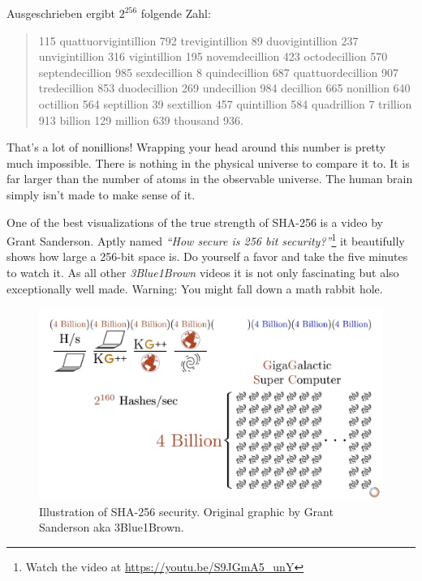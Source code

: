 Ausgeschrieben ergibt $2^{256}$ folgende Zahl:

\begin{quotation}\begin{samepage}
    115 quattuorvigintillion 792 trevigintillion 89 duovigintillion 237
    unvigintillion 316 vigintillion 195 novemdecillion 423 octodecillion 570
    septendecillion 985 sexdecillion 8 quindecillion 687 quattuordecillion 907
    tredecillion 853 duodecillion 269 undecillion 984 decillion 665 nonillion
    640 octillion 564 septillion 39 sextillion 457 quintillion 584 quadrillion 7
    trillion 913 billion 129 million 639 thousand 936.
\end{samepage}\end{quotation}

That's a lot of nonillions! Wrapping your head around this number is
pretty much impossible. There is nothing in the physical universe to
compare it to. It is far larger than the number of atoms in the
observable universe. The human brain simply isn't made to make sense of
it.

\newpage

One of the best visualizations of the true strength of SHA-256 is a video by
Grant Sanderson. Aptly named \textit{\enquote{How secure is 256 bit
security?}}\footnote{Watch the video at \url{https://youtu.be/S9JGmA5_unY}} it
beautifully shows how large a 256-bit space is. Do yourself a favor and take the
five minutes to watch it. As all other \textit{3Blue1Brown} videos it is not
only fascinating but also exceptionally well made. Warning: You might fall down
a math rabbit hole.

\begin{figure}
  \includegraphics{assets/images/youtube-vid-inverted.png}
  \caption{Illustration of SHA-256 security. Original graphic by Grant Sanderson aka 3Blue1Brown.}
  \label{fig:youtube-vid-inverted}
\end{figure}

